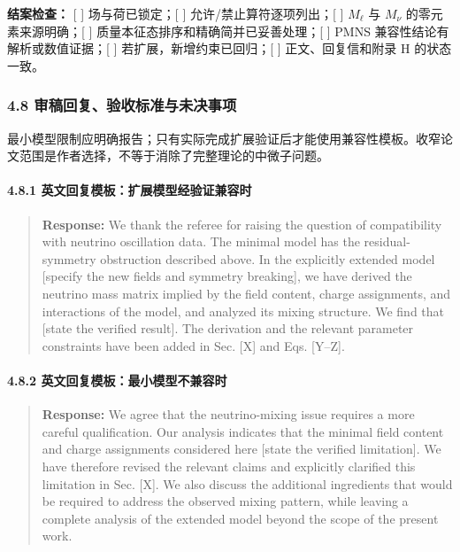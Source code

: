 \documentclass[
]{article}
\begin{document}
\textbf{结案检查：} {[} {]} 场与荷已锁定；{[} {]}
允许/禁止算符逐项列出；{[} {]} \(M_\ell\) 与 \(M_\nu\)
的零元素来源明确；{[} {]} 质量本征态排序和精确简并已妥善处理；{[} {]}
PMNS 兼容性结论有解析或数值证据；{[} {]} 若扩展，新增约束已回归；{[} {]}
正文、回复信和附录 H 的状态一致。

\subsubsection{4.8
审稿回复、验收标准与未决事项}\label{ux5ba1ux7a3fux56deux590dux9a8cux6536ux6807ux51c6ux4e0eux672aux51b3ux4e8bux9879-2}

最小模型限制应明确报告；只有实际完成扩展验证后才能使用兼容性模板。收窄论文范围是作者选择，不等于消除了完整理论的中微子问题。

\paragraph{4.8.1
英文回复模板：扩展模型经验证兼容时}\label{ux82f1ux6587ux56deux590dux6a21ux677fux6269ux5c55ux6a21ux578bux7ecfux9a8cux8bc1ux517cux5bb9ux65f6}

\begin{quote}
\textbf{Response:} We thank the referee for raising the question of
compatibility with neutrino oscillation data. The minimal model has the
residual-symmetry obstruction described above. In the explicitly
extended model {[}specify the new fields and symmetry breaking{]}, we
have derived the neutrino mass matrix implied by the field content,
charge assignments, and interactions of the model, and analyzed its
mixing structure. We find that {[}state the verified result{]}. The
derivation and the relevant parameter constraints have been added in
Sec. {[}X{]} and Eqs. {[}Y--Z{]}.
\end{quote}

\paragraph{4.8.2
英文回复模板：最小模型不兼容时}\label{ux82f1ux6587ux56deux590dux6a21ux677fux6700ux5c0fux6a21ux578bux4e0dux517cux5bb9ux65f6}

\begin{quote}
\textbf{Response:} We agree that the neutrino-mixing issue requires a
more careful qualification. Our analysis indicates that the minimal
field content and charge assignments considered here {[}state the
verified limitation{]}. We have therefore revised the relevant claims
and explicitly clarified this limitation in Sec. {[}X{]}. We also
discuss the additional ingredients that would be required to address the
observed mixing pattern, while leaving a complete analysis of the
extended model beyond the scope of the present work.
\end{quote}
\end{document}
